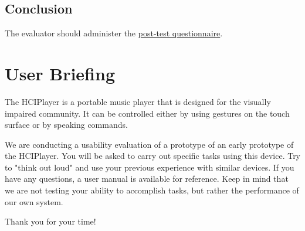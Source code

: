 \documentclass[12pt,letterpaper]{article}
\begin{document}
\subsection{Conclusion}

The evaluator should administer the \href{http://fluidsurveys.com/s/hciplayer-posttest/}{post-test questionnaire}.

\section{User Briefing}

The HCIPlayer is a portable music player that is designed for the visually impaired community. It can be controlled either by using gestures on the touch surface or by speaking commands.

We are conducting a usability evaluation of a prototype of an early prototype of the HCIPlayer. You will be asked to carry out specific tasks using this device. Try to "think out loud" and use your previous experience with similar devices. If you have any questions, a user manual is available for reference. Keep in mind that we are not testing your ability to accomplish tasks, but rather the performance of our own system.

Thank you for your time!
\end{document}
